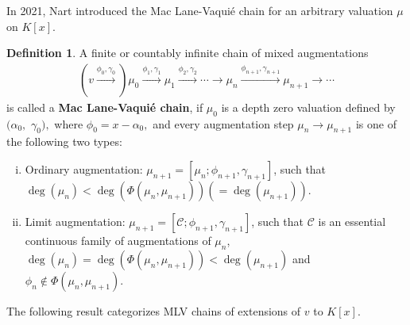 \documentclass[11pt]{amsart}
\theoremstyle{definition}
\newtheorem{definition}[theorem]{Definition}
\theoremstyle{remark}
\numberwithin{equation}{section}
\begin{document}
\vspace{.20pt}

In 2021, Nart \cite{EN1} introduced the Mac Lane-Vaqui\'e chain for an arbitrary valuation $\mu$ on $K[x].$ 


\begin{definition}
	A finite or countably infinite chain of mixed augmentations 
	\begin{align*}
			(v\xrightarrow{\phi_0,\gamma_0})\mu_0\xrightarrow{\phi_1,\gamma_1} \mu_1\xrightarrow{\phi_2,\gamma_2}\cdots \longrightarrow\mu_{n}\xrightarrow{\phi_{n+1},\gamma_{n+1}} \mu_{n+1}\longrightarrow\cdots
	\end{align*} is called a {\bf Mac Lane-Vaqui\'e  chain}, if  $\mu_0$ is a depth zero valuation defined by $(\alpha_0,$ $\gamma_0),$ where $\phi_0=x-\alpha_0,$ and every augmentation step $\mu_{n}\rightarrow \mu_{n+1}$ is one of the following two types:
	\begin{enumerate}[(i)]
		\item Ordinary augmentation: $\mu_{n+1}=[\mu_n; \phi_{n+1},\gamma_{n+1}]$, such that $\deg (\mu_{n})<\deg(\Phi(\mu_{n},\mu_{n+1}))(=\deg(\mu_{n+1})).$
		\item  Limit augmentation: $\mu_{n+1}=[\mathcal{C};\phi_{n+1},\gamma_{n+1}]$, such that $\mathcal{C}$ is an essential continuous family of augmentations of $\mu_n$,  $\deg (\mu_{n})=\deg(\Phi(\mu_{n},\mu_{n+1}))<\deg(\mu_{n+1})$ and $\phi_{n}\notin\Phi(\mu_{n},\mu_{n+1}).$
	\end{enumerate}
	
\end{definition}
The following result categorizes MLV chains of extensions of $v$ to $K[x].$
\end{document}
